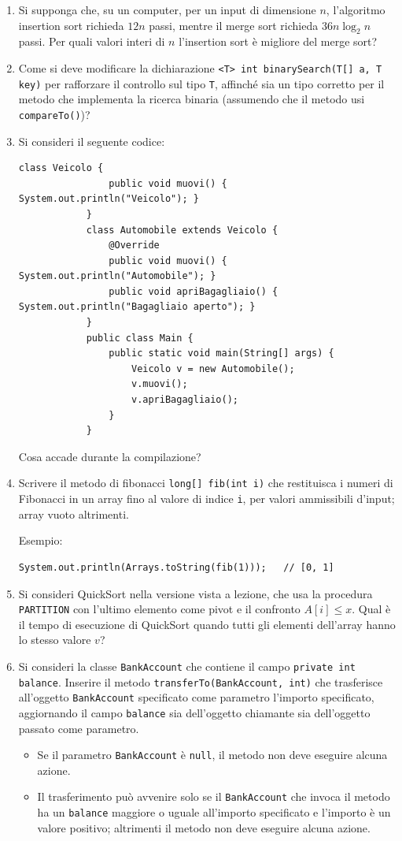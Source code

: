 \begin{enumerate}
		\item Si supponga che, su un computer, per un input di dimensione $n$, l'algoritmo insertion sort richieda $12n$ passi, mentre il merge sort richieda $36n\log_2 n$ passi. Per quali valori interi di $n$ l'insertion sort è migliore del merge sort?
		
		\item Come si deve modificare la dichiarazione \texttt{<T> int binarySearch(T[] a, T key)} per rafforzare il controllo sul tipo \texttt{T}, affinché sia un tipo corretto per il metodo che implementa la ricerca binaria (assumendo che il metodo usi \texttt{compareTo()})?
		
		\item Si consideri il seguente codice:
		\begin{lstlisting}[style=java]
			class Veicolo {
				public void muovi() { System.out.println("Veicolo"); }
			}
			class Automobile extends Veicolo {
				@Override
				public void muovi() { System.out.println("Automobile"); }
				public void apriBagagliaio() { System.out.println("Bagagliaio aperto"); }
			}
			public class Main {
				public static void main(String[] args) {
					Veicolo v = new Automobile();
					v.muovi();
					v.apriBagagliaio();
				}
			}
		\end{lstlisting}
		Cosa accade durante la compilazione?
		
		\item Scrivere il metodo di fibonacci \texttt{long[] fib(int i)} che restituisca i numeri di Fibonacci in un array fino al valore di indice \texttt{i}, per valori ammissibili d'input; array vuoto altrimenti.
		
		Esempio:
		\begin{lstlisting}[style=java]
			System.out.println(Arrays.toString(fib(1)));   // [0, 1]
		\end{lstlisting}
		
		\item Si consideri QuickSort nella versione vista a lezione, che usa la procedura \texttt{PARTITION} con l'ultimo elemento come pivot e il confronto $A[i]\le x$. Qual è il tempo di esecuzione di QuickSort quando tutti gli elementi dell'array hanno lo stesso valore $v$?
		
		\item Si consideri la classe \texttt{BankAccount} che contiene il campo \texttt{private int balance}. Inserire il metodo \texttt{transferTo(BankAccount, int)} che trasferisce all'oggetto \texttt{BankAccount} specificato come parametro l'importo specificato, aggiornando il campo \texttt{balance} sia dell'oggetto chiamante sia dell'oggetto passato come parametro.
		\begin{itemize}
			\item Se il parametro \texttt{BankAccount} è \texttt{null}, il metodo non deve eseguire alcuna azione.
			\item Il trasferimento può avvenire solo se il \texttt{BankAccount} che invoca il metodo ha un \texttt{balance} maggiore o uguale all'importo specificato e l'importo è un valore positivo; altrimenti il metodo non deve eseguire alcuna azione.
		\end{itemize}
		

\end{enumerate}
